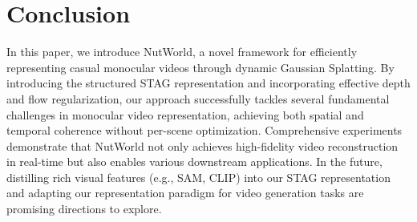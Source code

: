 \section{Conclusion}
In this paper, we introduce NutWorld, a novel framework for efficiently representing casual monocular videos through dynamic Gaussian Splatting. By introducing the structured STAG representation and incorporating effective depth and flow regularization, our approach successfully tackles several fundamental challenges in monocular video representation, achieving both spatial and temporal coherence without per-scene optimization. Comprehensive experiments demonstrate that NutWorld not only achieves high-fidelity video reconstruction in real-time but also enables various downstream applications. In the future, distilling rich visual features (e.g., SAM, CLIP) into our STAG representation and adapting our representation paradigm for video generation tasks are promising directions to explore.

